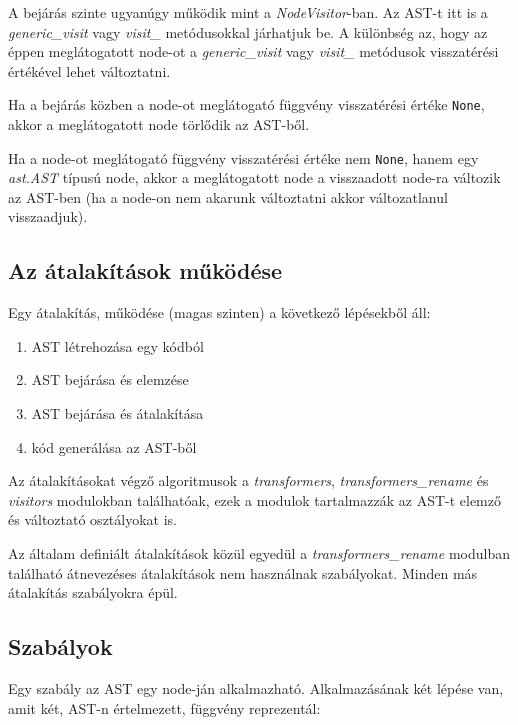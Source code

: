 A bejárás szinte ugyanúgy működik mint a \emph{NodeVisitor}-ban.
Az AST-t itt is a \emph{generic\_visit} vagy \emph{visit\_<node-class>} metódusokkal
járhatjuk be.
A különbség az, hogy az éppen meglátogatott node-ot a
\emph{generic\_visit} vagy \emph{visit\_<node-class>}
metódusok visszatérési értékével lehet változtatni. 

Ha a bejárás közben a node-ot meglátogató függvény visszatérési értéke \texttt{None},
akkor a meglátogatott node törlődik az AST-ből.

Ha a node-ot meglátogató függvény visszatérési értéke nem \texttt{None},
hanem egy \emph{ast.AST} típusú node,
akkor a meglátogatott node a visszaadott node-ra változik az AST-ben
(ha a node-on nem akarunk változtatni akkor változatlanul visszaadjuk).

\subsection{Az átalakítások működése}

Egy átalakítás, működése (magas szinten) %
a következő lépésekből áll:

\begin{enumerate}
	\item AST létrehozása egy kódból
	\item AST bejárása és elemzése
	\item AST bejárása és átalakítása
	\item kód generálása az AST-ből
\end{enumerate}

Az átalakításokat végző algoritmusok a \emph{transformers}, \emph{transformers\_rename}
és \emph{visitors} modulokban találhatóak, ezek a modulok tartalmazzák az AST-t
elemző és változtató osztályokat is.

Az általam definiált átalakítások közül egyedül
a \emph{transformers\_rename} modulban található átnevezéses
átalakítások nem használnak szabályokat.
Minden más átalakítás szabályokra épül.

\subsection{Szabályok}

Egy szabály az AST egy node-ján alkalmazható.
Alkalmazásának két lépése van, amit két, AST-n értelmezett, függvény reprezentál:

